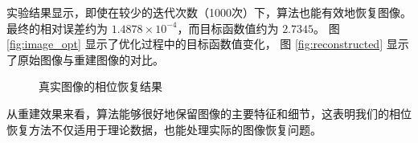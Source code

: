 \documentclass{article}
\begin{document}
实验结果显示，即使在较少的迭代次数（1000次）下，算法也能有效地恢复图像。
最终的相对误差约为 $1.4878\times 10^{-4}$，而目标函数值约为 $2.7345$。
图 \ref{fig:image_opt} 显示了优化过程中的目标函数值变化，
图 \ref{fig:reconstructed} 显示了原始图像与重建图像的对比。

\begin{figure}[h]
    \centering
    \caption{真实图像的相位恢复结果}
    \label{fig:real_image}
\end{figure}

从重建效果来看，算法能够很好地保留图像的主要特征和细节，这表明我们的相位恢复方法不仅适用于理论数据，也能处理实际的图像恢复问题。
\end{document}

